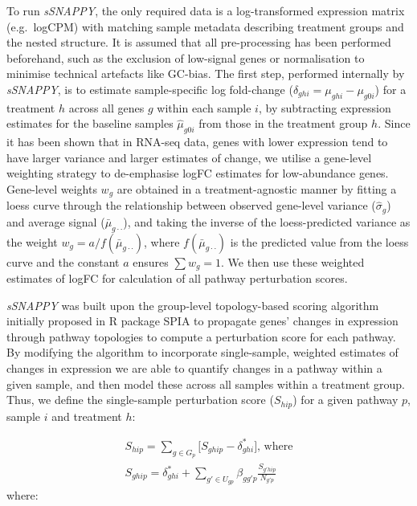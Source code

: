 \documentclass[9pt,a4paper,]{extarticle}
\begin{document}
To run \emph{sSNAPPY}, the only required data is a log-transformed expression matrix (e.g.~logCPM) with matching sample metadata describing treatment groups and the nested structure.
It is assumed that all pre-processing has been performed beforehand, such as the exclusion of low-signal genes or normalisation to minimise technical artefacts like GC-bias.
The first step, performed internally by \emph{sSNAPPY}, is to estimate sample-specific log fold-change (\(\delta_{ghi} = \mu_{ghi} - \mu_{g0i}\)) for a treatment \(h\) across all genes \(g\) within each sample \(i\), by subtracting expression estimates for the baseline samples \(\hat\mu_{g0i}\) from those in the treatment group \(h\).
Since it has been shown that in RNA-seq data, genes with lower expression tend to have larger variance and larger estimates of change\citep{Law2014}, we utilise a gene-level weighting strategy to de-emphasise logFC estimates for low-abundance genes.
Gene-level weights \(w_g\) are obtained in a treatment-agnostic manner by fitting a loess curve through the relationship between observed gene-level variance (\(\widehat\sigma_g\)) and average signal (\(\bar\mu_{g\cdot\cdot}\)), and taking the inverse of the loess-predicted variance as the weight \(w_g = a / f(\bar\mu_{g\cdot\cdot})\), where \(f(\bar\mu_{g\cdot\cdot})\) is the predicted value from the loess curve and the constant \(a\) ensures \(\sum w_g = 1\).
We then use these weighted estimates of logFC for calculation of all pathway perturbation scores.

\emph{sSNAPPY} was built upon the group-level topology-based scoring algorithm initially proposed in R package SPIA\citep{Tarca2009} to propagate genes' changes in expression through pathway topologies to compute a perturbation score for each pathway.
By modifying the algorithm to incorporate single-sample, weighted estimates of changes in expression we are able to quantify changes in a pathway within a given sample, and then model these across all samples within a treatment group.
Thus, we define the single-sample perturbation score (\(S_{hip}\)) for a given pathway \(p\), sample \(i\) and treatment \(h\):

\[
\begin{aligned}
S_{hip} = \sum_{g \in G_p} \lbrack S_{ghip} - \delta_{ghi}^*\rbrack \text{, where} \\
S_{ghip} = \delta_{ghi}^* + \sum_{g' \in U_{gp}} \beta_{gg'p} \frac{S_{g'hip}}{N_{g'p}} 
\end{aligned}
\]
where:
\end{document}
